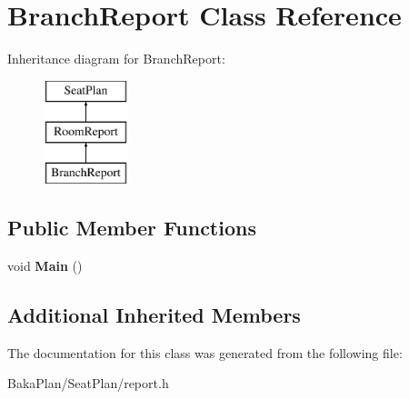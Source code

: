 \hypertarget{classBranchReport}{\section{Branch\-Report Class Reference}
\label{classBranchReport}
}
Inheritance diagram for Branch\-Report\-:\begin{figure}[H]
\begin{center}
\leavevmode
\includegraphics[height=3.000000cm]{classBranchReport}
\end{center}
\end{figure}
\subsection*{Public Member Functions}
\begin{DoxyCompactItemize}
\item 
\hypertarget{classBranchReport_acafa37b5ff6b8886333cc5ab8bb53fad}{void {\bfseries Main} ()}\label{classBranchReport_acafa37b5ff6b8886333cc5ab8bb53fad}

\end{DoxyCompactItemize}
\subsection*{Additional Inherited Members}


The documentation for this class was generated from the following file\-:\begin{DoxyCompactItemize}
\item 
Baka\-Plan/\-Seat\-Plan/report.\-h\end{DoxyCompactItemize}
